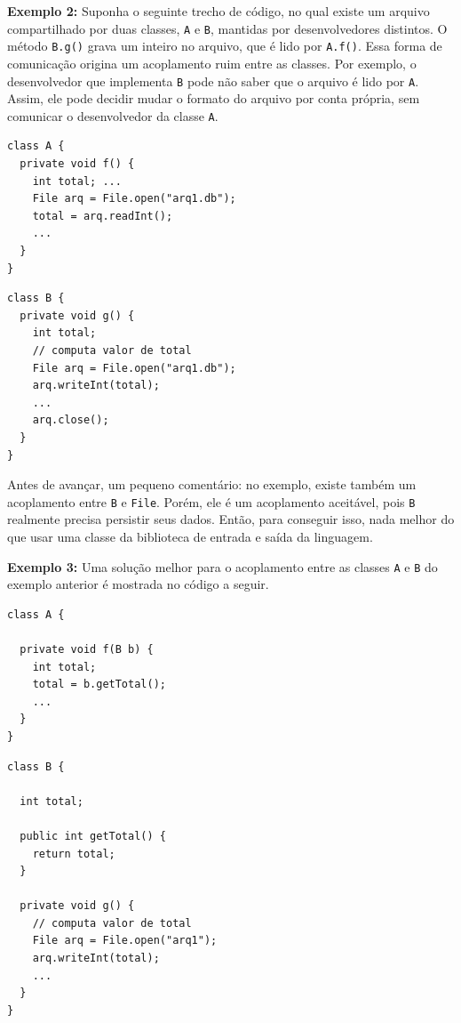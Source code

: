 \documentclass[
  11pt,
  twoside]{book}
\newcommand{\passthrough}[1]{#1}
\begin{document}
\textbf{Exemplo 2:} Suponha o seguinte trecho de código, no qual existe
um arquivo compartilhado por duas classes, \passthrough{\lstinline!A!} e
\passthrough{\lstinline!B!}, mantidas por desenvolvedores distintos. O
método \passthrough{\lstinline!B.g()!} grava um inteiro no arquivo, que
é lido por \passthrough{\lstinline!A.f()!}. Essa forma de comunicação
origina um acoplamento ruim entre as classes. Por exemplo, o
desenvolvedor que implementa \passthrough{\lstinline!B!} pode não saber
que o arquivo é lido por \passthrough{\lstinline!A!}. Assim, ele pode
decidir mudar o formato do arquivo por conta própria, sem comunicar o
desenvolvedor da classe \passthrough{\lstinline!A!}.

\begin{lstlisting}
class A {
  private void f() {
    int total; ...
    File arq = File.open("arq1.db");
    total = arq.readInt();
    ...
  }
}
\end{lstlisting}

\begin{lstlisting}
class B {
  private void g() {
    int total;
    // computa valor de total
    File arq = File.open("arq1.db");
    arq.writeInt(total);
    ...
    arq.close();
  }
}
\end{lstlisting}

Antes de avançar, um pequeno comentário: no exemplo, existe também um
acoplamento entre \passthrough{\lstinline!B!} e
\passthrough{\lstinline!File!}. Porém, ele é um acoplamento aceitável,
pois \passthrough{\lstinline!B!} realmente precisa persistir seus dados.
Então, para conseguir isso, nada melhor do que usar uma classe da
biblioteca de entrada e saída da linguagem.

\textbf{Exemplo 3:} Uma solução melhor para o acoplamento entre as
classes \passthrough{\lstinline!A!} e \passthrough{\lstinline!B!} do
exemplo anterior é mostrada no código a seguir.

\begin{lstlisting}
class A {

  private void f(B b) {
    int total;
    total = b.getTotal();
    ...
  }
}
\end{lstlisting}

\begin{lstlisting}
class B {

  int total;

  public int getTotal() {
    return total;
  }

  private void g() {
    // computa valor de total
    File arq = File.open("arq1");
    arq.writeInt(total);
    ...
  }
}
\end{lstlisting}
\end{document}
